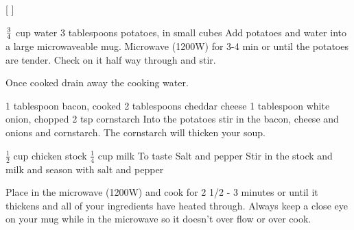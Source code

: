 [
]

\begin{step}
$\frac{3}{4}$ cup water
3 tablespoons potatoes, in small cubes
\method
Add potatoes and water into a large microwaveable mug. Microwave (1200W) for 3-4 min or until the potatoes are tender. Check on it half way through and stir.

Once cooked drain away the cooking water.
\end{step}

\begin{step}
1 tablespoon bacon, cooked
2 tablespoons cheddar cheese
1 tablespoon white onion, chopped
2 tsp cornstarch
\method
Into the potatoes stir in the bacon, cheese and onions and cornstarch. The cornstarch will thicken your soup.
\end{step}

\begin{step}
$\frac{1}{2}$ cup chicken stock
$\frac{1}{4}$ cup milk
To taste Salt and pepper
\method
Stir in the stock and milk and season with salt and pepper

Place in the microwave (1200W) and cook for 2 1/2 - 3 minutes or until it thickens and all of your ingredients have heated through. Always keep a close eye on your mug while in the microwave so it doesn’t over flow or over cook.
\end{step}